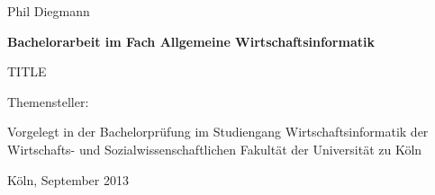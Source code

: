 \vspace*{1mm}

\thispagestyle{empty}
Phil Diegmann

\vspace*{23mm}

\begin{center}
\textbf{
    Bachelorarbeit
\linebreak
    im Fach Allgemeine Wirtschaftsinformatik}
\end{center}

\vspace*{20mm}

\begin{center}
\LARGE 
    TITLE
\end{center}

\vspace*{8mm}

\begin{center}
    Themensteller: 
\end{center}

\vspace*{12mm}

\begin{center}
    Vorgelegt in der Bachelorprüfung
\linebreak
    im Studiengang Wirtschaftsinformatik
\linebreak
    der Wirtschafts- und Sozialwissenschaftlichen Fakultät
\linebreak
    der Universität zu Köln
\end{center}

\vspace*{30mm}

\begin{center}
Köln, September 2013
\end{center}



